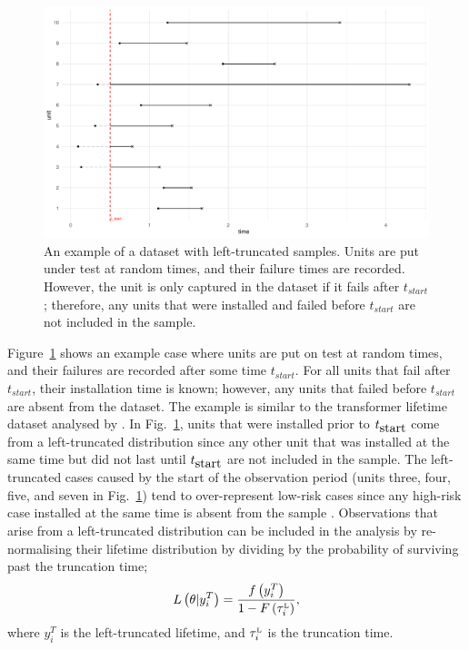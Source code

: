 \begin{figure}[h]
    \centering
    \includegraphics[width=1\textwidth]{./figures/left_truncation_example.pdf}
    \caption{An example of a dataset with left-truncated samples. Units are put under test at random times, and their failure times are recorded. However, the unit is only captured in the dataset if it fails after $t_{start}$; therefore, any units that were installed and failed before $t_{start}$ are not included in the sample.}
    \label{fig:left_trunc_example}
\end{figure}

Figure~\ref{fig:left_trunc_example} shows an example case where units are put on test at random times, and their failures are recorded after some time $t_{start}$. For all units that fail after $t_{start}$, their installation time is known; however, any units that failed before $t_{start}$ are absent from the dataset. The example is similar to the transformer lifetime dataset analysed by \citet{hong2009}. In Fig.~\ref{fig:left_trunc_example}, units that were installed prior to $t_{\hbox{start}}$ come from a left-truncated distribution since any other unit that was installed at the same time but did not last until $t_{\hbox{start}}$ are not included in the sample. The left-truncated cases caused by the start of the observation period (units three, four, five, and seven in Fig.~\ref{fig:left_trunc_example}) tend to over-represent low-risk cases since any high-risk case installed at the same time is absent from the sample \citep{guo1993}. Observations that arise from a left-truncated distribution can be included in the analysis by re-normalising their lifetime distribution by dividing by the probability of surviving past the truncation time;
\begin{equation}
    \label{eq:left_trunc}
    L\left(\theta|y^T_i\right) = \frac{f\left(y^T_i\right)}{1 - F\left(\tau^{\hbox{\tiny{L}}}_i\right)},
\end{equation}
where $y^T_i$ is the left-truncated lifetime, and $\tau^{\hbox{\tiny{L}}}_i$ is the truncation time.

